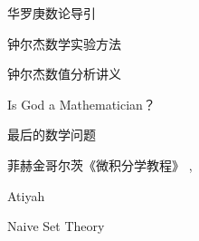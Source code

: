 \documentclass[main.tex]{subfiles}
\begin{document}
华罗庚数论导引
\cite[p.~1]{HuaL}

钟尔杰数学实验方法 \cite{ZhongEr1}

钟尔杰数值分析讲义 \cite{ZhongEr2}

Is God a Mathematician？\cite{LivioM}

最后的数学问题 \cite{LivioM2}

菲赫金哥尔茨《微积分学教程》\cite{FeiH1}
\cite{FeiH2}, \cite{FeiH3}

Atiyah \cite{AM69}

Naive Set Theory \cite{HalmosP}
\end{document}
